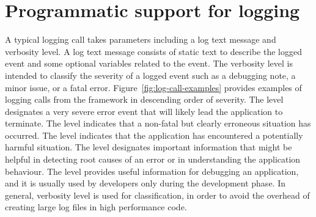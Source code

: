 


\section{Programmatic support for logging} \label{background Logging}
A typical logging call takes parameters including a log text message and verbosity level. A log text message consists of static text to describe the logged event and some optional variables related to the event. The verbosity level is intended to classify the severity of a logged event such as a debugging note, a minor issue, or a fatal error. Figure~\ref{fig:log-call-examples} provides examples of logging calls from the  framework in descending order of severity. The  level designates a very severe error event that will likely lead the application to terminate. The  level indicates that a non-fatal but clearly erroneous situation has occurred. The  level indicates that the application has encountered a potentially harmful situation. The  level designates important information that might be helpful in detecting root causes of an error or in understanding the application behaviour. The  level provides useful information for debugging an application, and it is usually used by developers only during the development phase. In general, verbosity level is used for classification, in order to avoid the overhead of creating large log files in high performance code.


